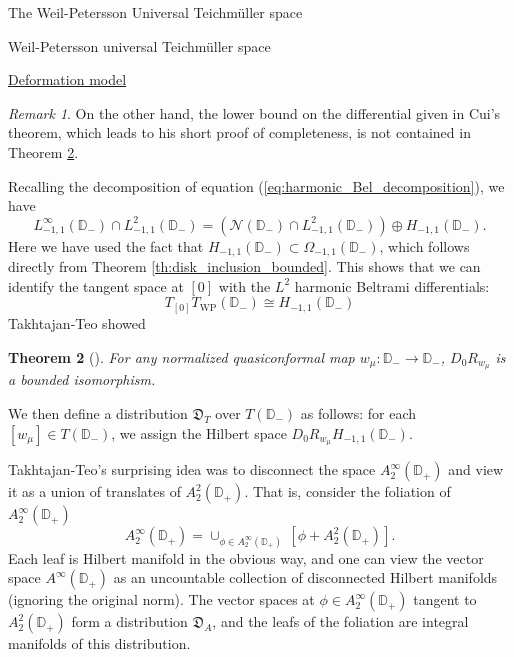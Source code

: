 \documentclass[12pt]{amsart}
\newcommand{\disk}{\ensuremath{\mathbb{D}} } %
\theoremstyle{plain}
\newtheorem{theorem}{Theorem}[section]
\theoremstyle{definition}
\theoremstyle{remark}
\newtheorem{remark}[theorem]{Remark}
\numberwithin{equation}{section} %
\numberwithin{figure}{section} %
\begin{document}
\begin{section}{The Weil-Petersson Universal Teichm\"uller space}
\begin{subsection}{Weil-Petersson universal Teichm\"uller space}
\begin{subsubsection}{{\underline{Deformation model}}}
\begin{remark}
     On the other hand, the lower bound on the differential given in Cui's theorem, which leads to his short proof of completeness, is not contained in Theorem \ref{th:right_translation_TT}.  
   \end{remark}
 
  Recalling the decomposition of equation (\ref{eq:harmonic_Bel_decomposition}), we have
   \begin{equation}
     L^\infty_{-1,1}(\disk_-) \cap L^2_{-1,1}(\disk_-) = \left( \mathcal{N}(\disk_-) \cap L^2_{-1,1}(\disk_-) \right) \oplus H_{-1,1}(\disk_-).   
   \end{equation}
   Here we have used the fact that $H_{-1,1}(\disk_-) \subset \Omega_{-1,1}(\disk_-)$, which follows directly from Theorem \ref{th:disk_inclusion_bounded}.
   This shows that we can identify the tangent space at $[0]$ with the $L^2$ harmonic Beltrami differentials:
   \[  T_{[0]} T_{\mathrm{WP}}(\disk_-) \cong H_{-1,1}(\disk_-) \] 
   Takhtajan-Teo showed
   \begin{theorem}[\cite{Takhtajan_Teo_Memoirs}] \label{th:right_translation_TT} For any normalized quasiconformal map $w_\mu:\disk_- \rightarrow \disk_-$,
     $D_0 R_{w_\mu}$ is a bounded isomorphism. 
   \end{theorem}
   
   We then define a distribution $\mathfrak{D}_T$ over $T(\disk_-)$ as follows: for each $[w_\mu] \in T(\disk_-)$, we assign the Hilbert space $D_0 R_{w_\mu}  H_{-1,1}(\disk_-)$.  

   Takhtajan-Teo's surprising idea was to disconnect the space $A_2^\infty(\disk_+)$ and view it as a union of translates of $A_2^2(\disk_+)$. That is, consider the foliation of $A_2^\infty(\disk_+)$ 
   \[      A_2^\infty(\disk_+) = \cup_{\phi \in A^\infty_2(\disk_+)} \, \left[ \phi + A_2^2(\disk_+) \right].         \]
   Each leaf is Hilbert manifold in the obvious way, and one can view the vector space $A^\infty(\disk_+)$ as an uncountable collection of disconnected Hilbert manifolds (ignoring the original norm). The vector spaces at $\phi \in A_2^\infty(\disk_+)$  tangent to $A_2^2(\disk_+)$ form a distribution $\mathfrak{D}_A$, and the leafs of the foliation are integral manifolds of this distribution. 


\end{subsubsection}
\end{subsection}
\end{section}
\end{document}

